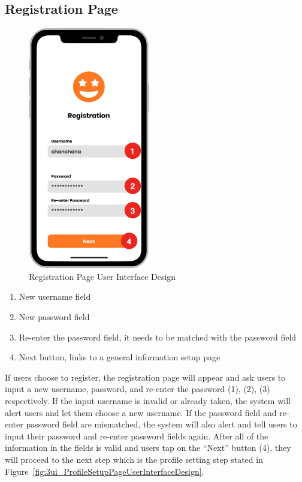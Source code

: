 \documentclass[12pt,oneside,openright,a4paper]{cpe-english-project}
\begin{document}
\subsection{Registration Page}
\begin{figure}[H]\centering
\includegraphics[height=300pt]{./images/3ui_RegistrationPageUserInterfaceDesign.png}
\caption{Registration Page User Interface Design}\label{fig:3ui_RegistrationPageUserInterfaceDesign}
\end{figure}
\begin{enumerate}
\item New username field
\item New password field
\item Re-enter the password field, it needs to be matched with the password field
\item Next button, links to a general information setup page
\end{enumerate}
If users choose to register, the registration page will appear and ask users to input a new username, password, and re-enter the password (1), (2), (3) respectively. If the input username is invalid or already taken, the system will alert users and let them choose a new username. If the password field and re-enter password field are mismatched, the system will also alert and tell users to input their password and re-enter password fields again. After all of the information in the fields is valid and users tap on the “Next” button (4), they will proceed to the next step which is the profile setting step stated in Figure~\ref{fig:3ui_ProfileSetupPageUserInterfaceDesign}.
\end{document}
